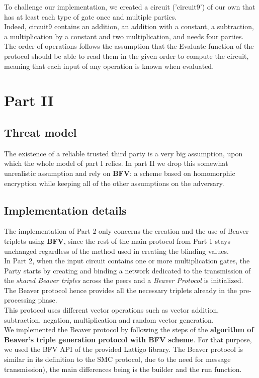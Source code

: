 \documentclass[10pt,conference,compsocconf]{IEEEtran}
\begin{document}
To challenge our implementation, we created a circuit ('circuit9') of our own that has at least each type of gate once and multiple parties.\\
Indeed, circuit9 contains an addition, an addition with a constant, a subtraction, a multiplication by a constant and two multiplication, and needs four parties. The order of operations follows the assumption that the Evaluate function of the protocol should be able to read them in the given order to compute the circuit, meaning that each input of any operation is known when evaluated.
    
\section{Part II}
\subsection{Threat model}

The existence of a reliable trusted third party is a very big assumption, upon which the whole model of part I relies. In part II we drop this somewhat unrealistic assumption and rely on \textbf{BFV}: a scheme based on homomorphic encryption while keeping all of the other assumptions on the adversary. \\


\subsection{Implementation details}
The implementation of Part 2 only concerns the creation and the use of Beaver triplets using \textbf{BFV}, since the rest of the main protocol from Part 1 stays unchanged regardless of the method used in creating the blinding values. \\
In Part 2, when the input circuit contains one or more multiplication gates, the Party starts by creating and binding a network dedicated to the transmission of the \textit{shared Beaver triples} across the peers and a \textit{Beaver Protocol} is initialized. The Beaver protocol hence provides all the necessary triplets already in the pre-processing phase.\\

This protocol uses different vector operations such as vector addition, subtraction, negation, multiplication and random vector generation.\\

We implemented the Beaver protocol by following the steps of the \textbf{algorithm of Beaver's triple generation protocol with BFV scheme}. For that purpose, we used the BFV API of the provided Lattigo library. The Beaver protocol is similar in its definition to the SMC protocol, due to the need for message transmission), the main differences being is the builder and the run function. \\
\end{document}
